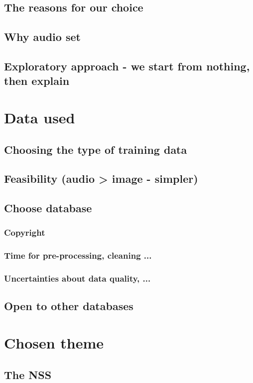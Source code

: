 \documentclass{article}
\begin{document}
\subsection{The reasons for our choice}

\subsection{Why audio set}

\subsection{Exploratory approach - we start from nothing, then explain}


\section{Data used}
\subsection{Choosing the type of training data}
\subsection{Feasibility (audio > image - simpler)}
\subsection{Choose database}
\subsubsection{Copyright}
\subsubsection{Time for pre-processing, cleaning ...}
\subsubsection{Uncertainties about data quality, ...}
\subsection{Open to other databases}

\section{Chosen theme}
\subsection{The NSS}
\end{document}
